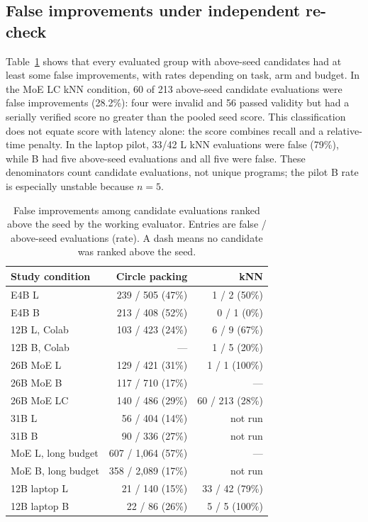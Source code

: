 \documentclass[11pt]{article}
\begin{document}
\subsection{False improvements under independent re-check}

Table~\ref{tab:false} shows that every evaluated group with above-seed candidates had at least some false improvements, with rates depending on task, arm and budget. In the MoE LC kNN condition, 60 of 213 above-seed candidate evaluations were false improvements (28.2\%): four were invalid and 56 passed validity but had a serially verified score no greater than the pooled seed score. This classification does not equate score with latency alone: the score combines recall and a relative-time penalty. In the laptop pilot, 33/42 L kNN evaluations were false (79\%), while B had five above-seed evaluations and all five were false. These denominators count candidate evaluations, not unique programs; the pilot B rate is especially unstable because $n=5$.

\begin{table}[tb]
\centering\small
\caption{False improvements among candidate evaluations ranked above the seed by the working evaluator. Entries are false / above-seed evaluations (rate). A dash means no candidate was ranked above the seed.}
\label{tab:false}
\begin{tabularx}{\linewidth}{@{}lrr@{}}
\toprule
Study condition & Circle packing & kNN \\
\midrule
E4B L & 239 / 505 (47\%) & 1 / 2 (50\%) \\
E4B B & 213 / 408 (52\%) & 0 / 1 (0\%) \\
12B L, Colab & 103 / 423 (24\%) & 6 / 9 (67\%) \\
12B B, Colab & --- & 1 / 5 (20\%) \\
26B MoE L & 129 / 421 (31\%) & 1 / 1 (100\%) \\
26B MoE B & 117 / 710 (17\%) & --- \\
26B MoE LC & 140 / 486 (29\%) & 60 / 213 (28\%) \\
31B L & 56 / 404 (14\%) & not run \\
31B B & 90 / 336 (27\%) & not run \\
MoE L, long budget & 607 / 1,064 (57\%) & --- \\
MoE B, long budget & 358 / 2,089 (17\%) & not run \\
12B laptop L & 21 / 140 (15\%) & 33 / 42 (79\%) \\
12B laptop B & 22 / 86 (26\%) & 5 / 5 (100\%) \\
\bottomrule
\end{tabularx}
\end{table}
\end{document}
